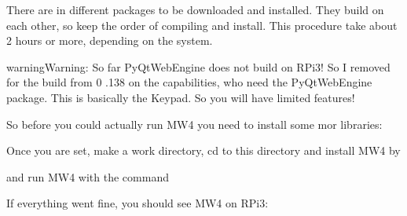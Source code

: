 \documentclass[a4paper,10pt,english]{sphinxmanual}
\begin{document}
\sphinxAtStartPar
There are in different packages to be downloaded and installed. They build on each
other, so keep the order of compiling and install. This procedure take about 2
hours or more, depending on the system.

\begin{sphinxadmonition}{warning}{Warning:}
\sphinxAtStartPar
So far PyQtWebEngine does not build on RPi3! So I removed for the build from 0
.138 on the capabilities, who need the PyQtWebEngine package. This is
basically the Keypad. So you will have limited features!
\end{sphinxadmonition}

\sphinxAtStartPar
So before you could actually run MW4 you need to install some mor libraries:

\begin{sphinxVerbatim}[commandchars=\\\{\}]
   
    
     
\end{sphinxVerbatim}

\sphinxAtStartPar
Once you are set, make a work directory, cd to this directory and install MW4 by

\begin{sphinxVerbatim}[commandchars=\\\{\}]
    
\end{sphinxVerbatim}

\sphinxAtStartPar
and run MW4 with the command

\begin{sphinxVerbatim}[commandchars=\\\{\}]
 
\end{sphinxVerbatim}

\sphinxAtStartPar
If everything went fine, you should see MW4 on RPi3:
\end{document}
